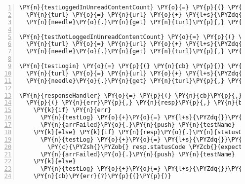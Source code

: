 \begin{Verbatim}[fontsize=\scriptsize,commandchars=\\\{\},numbers=left,firstnumber=1,stepnumber=1]
\PY{n}{testLoggedInUnreadContentCount} \PY{o}{=} \PY{p}{(} \PY{n}{cb} \PY{p}{)} \PY{o}{\PYZhy{}}\PY{o}{\PYZgt{}}
  \PY{n}{turl} \PY{o}{=} \PY{n}{url} \PY{o}{+} \PY{l+s}{\PYZdq{}}\PY{l+s}{user/unreadcontentcount}\PY{l+s}{\PYZdq{}}
  \PY{n}{needle}\PY{o}{.}\PY{n}{get} \PY{n}{turl}\PY{p}{,} \PY{n}{options}\PY{p}{,} \PY{n}{responseHandler} \PY{n}{cb}\PY{p}{,} \PY{l+s}{\PYZsq{}}\PY{l+s}{testLoggedInUnreadContentCount}\PY{l+s}{\PYZsq{}}\PY{p}{,} \PY{l+m+mi}{200}

\PY{n}{testNotLoggedInUnreadContentCount} \PY{o}{=} \PY{p}{(} \PY{n}{cb} \PY{p}{)} \PY{o}{\PYZhy{}}\PY{o}{\PYZgt{}}
  \PY{n}{turl} \PY{o}{=} \PY{n}{url} \PY{o}{+} \PY{l+s}{\PYZdq{}}\PY{l+s}{user/unreadcontentcount}\PY{l+s}{\PYZdq{}}
  \PY{n}{needle}\PY{o}{.}\PY{n}{get} \PY{n}{turl}\PY{p}{,} \PY{n}{timeout}\PY{p}{:} \PY{n}{testTimeout}\PY{p}{,} \PY{n}{responseHandler} \PY{n}{cb}\PY{p}{,} \PY{l+s}{\PYZsq{}}\PY{l+s}{testNotLoggedInUnreadContentCount}\PY{l+s}{\PYZsq{}}\PY{p}{,} \PY{l+m+mi}{400}

\PY{n}{testLogin} \PY{o}{=} \PY{p}{(} \PY{n}{cb} \PY{p}{)} \PY{o}{\PYZhy{}}\PY{o}{\PYZgt{}}
  \PY{n}{turl} \PY{o}{=} \PY{n}{url} \PY{o}{+} \PY{l+s}{\PYZdq{}}\PY{l+s}{auth/login/email/\PYZsh{}\PYZob{} params.username \PYZcb{}/password/\PYZsh{}\PYZob{} params.password \PYZcb{}}\PY{l+s}{\PYZdq{}}
  \PY{n}{needle}\PY{o}{.}\PY{n}{get} \PY{n}{turl}\PY{p}{,} \PY{n}{timeout}\PY{p}{:} \PY{n}{testTimeout}\PY{p}{,} \PY{n}{responseHandler} \PY{n}{cb}\PY{p}{,} \PY{l+s}{\PYZsq{}}\PY{l+s}{testLogin}\PY{l+s}{\PYZsq{}}\PY{p}{,} \PY{l+m+mi}{200}

\PY{n}{responseHandler} \PY{o}{=} \PY{p}{(} \PY{n}{cb}\PY{p}{,} \PY{n}{testName}\PY{p}{,} \PY{n}{expectedCode} \PY{p}{)} \PY{o}{\PYZhy{}}\PY{o}{\PYZgt{}}
  \PY{p}{(} \PY{n}{err}\PY{p}{,} \PY{n}{resp}\PY{p}{,} \PY{n}{body} \PY{p}{)} \PY{o}{\PYZhy{}}\PY{o}{\PYZgt{}}
    \PY{k}{if} \PY{n}{err}
      \PY{n}{testLog} \PY{o}{+}\PY{o}{=} \PY{l+s}{\PYZdq{}}\PY{l+s}{\PYZlt{}b\PYZgt{} \PYZhy{} FAIL | \PYZsh{}\PYZob{} testName \PYZcb{}: Timeout! Server didn}\PY{l+s}{\PYZsq{}}\PY{l+s}{t answer within \PYZsh{}\PYZob{} testTimeout / 1000 \PYZcb{} seconds\PYZlt{}/b\PYZgt{}\PYZlt{}br/\PYZgt{}}\PY{l+s}{\PYZdq{}}
      \PY{n}{arrFailed}\PY{o}{.}\PY{n}{push} \PY{n}{testName}
    \PY{k}{else} \PY{k}{if} \PY{n}{resp}\PY{o}{.}\PY{n}{statusCode} \PY{n}{isnt} \PY{n}{expectedCode}
      \PY{n}{testLog} \PY{o}{+}\PY{o}{=} \PY{l+s}{\PYZdq{}}\PY{l+s}{\PYZlt{}b\PYZgt{} \PYZhy{} FAIL | \PYZsh{}\PYZob{} testName \PYZcb{}: Response }
        \PY{c}{\PYZsh{}\PYZob{} resp.statusCode \PYZcb{}(expected: \PYZsh{}\PYZob{} expectedCode \PYZcb{}), \PYZsh{}\PYZob{} body.error.message \PYZcb{}\PYZlt{}/b\PYZgt{}\PYZlt{}br/\PYZgt{}\PYZdq{}}
      \PY{n}{arrFailed}\PY{o}{.}\PY{n}{push} \PY{n}{testName}
    \PY{k}{else}
      \PY{n}{testLog} \PY{o}{+}\PY{o}{=} \PY{l+s}{\PYZdq{}}\PY{l+s}{ + SUCCESS | \PYZsh{}\PYZob{} testName \PYZcb{}\PYZlt{}br/\PYZgt{}}\PY{l+s}{\PYZdq{}}
    \PY{n}{cb}\PY{err}{?}\PY{p}{(}\PY{p}{)}
\end{Verbatim}